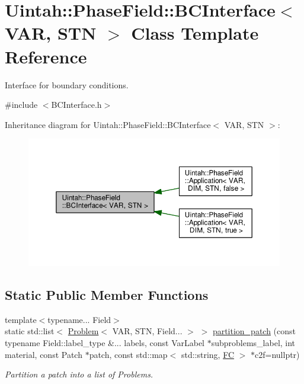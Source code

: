 \hypertarget{structUintah_1_1PhaseField_1_1BCInterface}{}\section{Uintah\+:\+:Phase\+Field\+:\+:B\+C\+Interface$<$ V\+AR, S\+TN $>$ Class Template Reference}
\label{structUintah_1_1PhaseField_1_1BCInterface}


Interface for boundary conditions.  




{\ttfamily \#include $<$B\+C\+Interface.\+h$>$}



Inheritance diagram for Uintah\+:\+:Phase\+Field\+:\+:B\+C\+Interface$<$ V\+AR, S\+TN $>$\+:\nopagebreak
\begin{figure}[H]
\begin{center}
\leavevmode
\includegraphics[width=350pt]{structUintah_1_1PhaseField_1_1BCInterface__inherit__graph}
\end{center}
\end{figure}
\subsection*{Static Public Member Functions}
\begin{DoxyCompactItemize}
\item 
{\footnotesize template$<$typename... Field$>$ }\\static std\+::list$<$ \hyperlink{classUintah_1_1PhaseField_1_1Problem}{Problem}$<$ V\+AR, S\+TN, Field... $>$ $>$ \hyperlink{structUintah_1_1PhaseField_1_1BCInterface_a50bf60e11fabf331dd0f21c28f46c7fc}{partition\+\_\+patch} (const typename Field\+::label\+\_\+type \&... labels, const Var\+Label $\ast$subproblems\+\_\+label, int material, const Patch $\ast$patch, const std\+::map$<$ std\+::string, \hyperlink{namespaceUintah_1_1PhaseField_aeb51fe956fe07f1487f5878f4039f27c}{FC} $>$ $\ast$c2f=nullptr)
\begin{DoxyCompactList}\small\item\em Partition a patch into a list of Problems. \end{DoxyCompactList}\end{DoxyCompactItemize}


